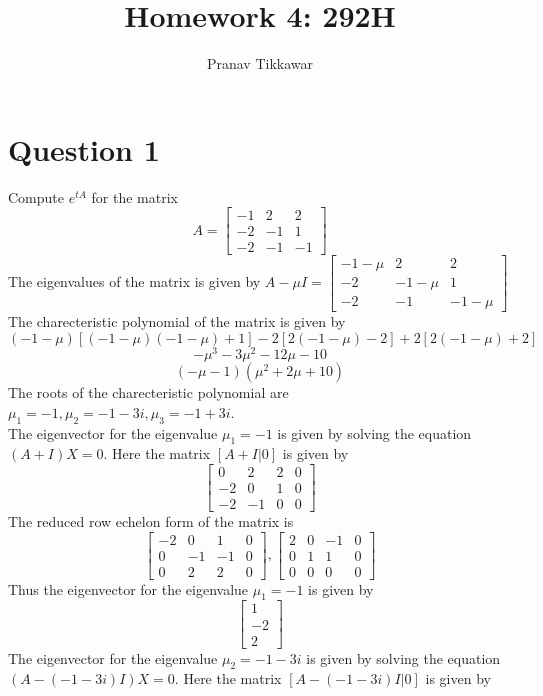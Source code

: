 \documentclass{article}
\author{Pranav Tikkawar}
\title{Homework 4: 292H}
\begin{document}
\maketitle
\section*{Question 1}
Compute $e^{tA}$ for the matrix $$A = \begin{bmatrix}
    -1 & 2 & 2 \\
    -2 & -1 & 1 \\
    -2 & -1 & -1
\end{bmatrix}$$ 
The eigenvalues of the matrix is given by $A - \mu I = \begin{bmatrix}
    -1 - \mu & 2 & 2 \\
    -2 & -1 - \mu & 1 \\
    -2 & -1 & -1 - \mu
\end{bmatrix} $
The charecteristic polynomial of the matrix is given by
$$(-1 - \mu)[(-1-\mu)(-1-\mu) + 1] - 2[2(-1-\mu) - 2] + 2[2(-1-\mu) + 2] $$
$$-\mu^3 - 3 \mu^2 - 12\mu - 10 $$
$$(-\mu -1)(\mu^2 + 2\mu + 10)$$
The roots of the charecteristic polynomial are $\mu_1 = -1, \mu_2 = -1-3i, \mu_3 = -1+3i$.\\
The eigenvector for the eigenvalue $\mu_1 = -1$ is given by solving the equation $(A + I)X = 0$. Here the matrix $[A + I | 0]$ is given by
$$\begin{bmatrix}
    0 & 2 & 2 & 0\\
    -2 & 0 & 1 & 0\\
    -2 & -1 & 0 &0
\end{bmatrix} $$
The reduced row echelon form of the matrix is
$$ \begin{bmatrix}
    -2 & 0 & 1 & 0\\
    0 & -1 & -1 & 0\\
    0 & 2 & 2 & 0
\end{bmatrix}, 
\begin{bmatrix}
    2 & 0 & -1 & 0\\
    0 & 1 & 1 & 0\\
    0 & 0 & 0 & 0
\end{bmatrix}$$
Thus the eigenvector for the eigenvalue $\mu_1 = -1$ is given by
$$\begin{bmatrix}
    1\\
    -2\\
    2
\end{bmatrix} $$
The eigenvector for the eigenvalue $\mu_2 = -1-3i$ is given by solving the equation $(A - (-1-3i) I)X = 0$. Here the matrix $[A - (-1-3i) I | 0]$ is given by
\end{document}
